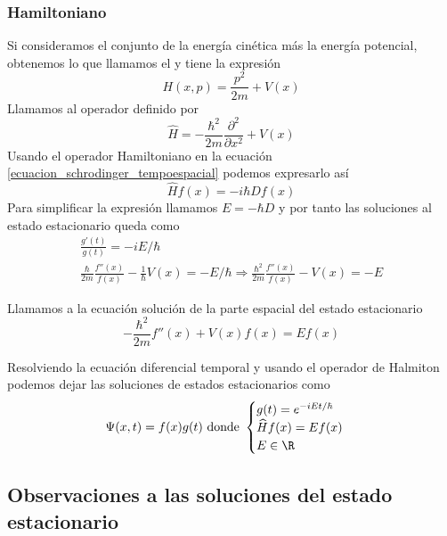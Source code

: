 \subsubsection{Hamiltoniano}
Si consideramos el conjunto de la energía cinética más la energía potencial, obtenemos lo que llamamos el  y tiene la expresión
\begin{equation}\label{halmitoniano}
H(x,p)=\frac{p^2}{2m}+V(x)
\end{equation}
Llamamos  al operador definido por
\begin{equation}\label{operador_hamiltoniano}
\widehat{H}=-\frac{\hbar^2}{2m}\frac{\partial^2}{\partial x^2}+V(x)
\end{equation}
Usando el operador Hamiltoniano en la ecuación \ref{ecuacion_schrodinger_tempoespacial} podemos expresarlo así
\begin{equation*}
\widehat{H}f(x)=-i\hbar Df(x)
\end{equation*}
Para simplificar la expresión llamamos $E=-\hbar D$ y por tanto las soluciones al estado estacionario queda como
\begin{gather*}
\frac{g'(t)}{g(t)}=-iE/\hbar
\\
\frac{\hbar}{2m}\frac{f''(x)}{f(x)}-\frac{1}{\hbar}V(x)=-E/\hbar\Rightarrow \frac{\hbar^2}{2m}\frac{f''(x)}{f(x)}-V(x)=-E
\end{gather*}

\begin{definicion}
	Llamamos  a la ecuación solución de la parte espacial del estado estacionario
	\begin{equation}\label{ecuacion_schrodinger_tempoespacial}
	-\frac{\hbar^2}{2m}f''(x)+V(x)f(x)= Ef(x)
	\end{equation}
\end{definicion}

Resolviendo la ecuación diferencial temporal y usando el operador de Halmiton podemos dejar las soluciones de estados estacionarios como 
\begin{equation}\label{solucion_estado_estacionario}
\Psi(x,t)=f(x)g(t)\text{ donde }
\begin{cases}
g(t)=e^{-iEt/\hbar}\\ 
\widehat{H}f(x)=Ef(x)\\
E\in\R
\end{cases}
\end{equation} 

\subsection{Observaciones a las soluciones del estado estacionario}

